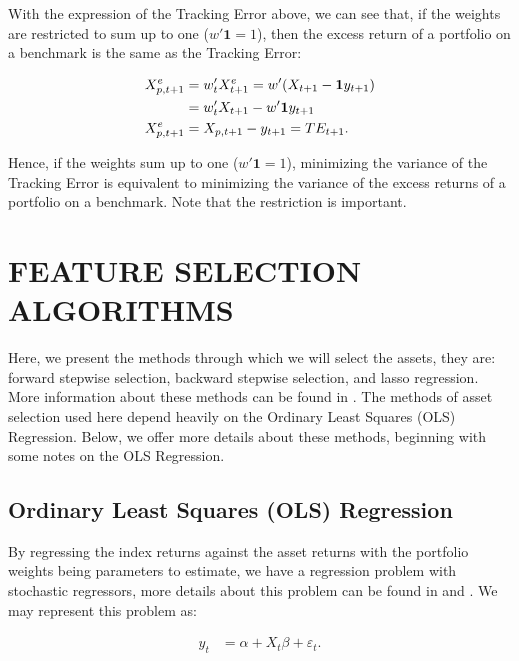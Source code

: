 \documentclass[12pt,oneside,a4paper]{memoir}
\begin{document}
With the expression of the Tracking Error above, we can see that, if the weights are restricted to sum up to one ($w'\mathbf{1}=1$), then the excess return of a portfolio on a benchmark is the same as the Tracking Error:

\vspace{-18 pt}
\begin{align}
	\notag
	X^{e}_{p,t+1} & = w_{t}'X^{e}_{t+1} = w'(X_{t+1} - \mathbf{1} y_{t+1})
	\\
	\notag
	& = w_{t}'X_{t+1} - w'\mathbf{1} y_{t+1}
	\\
	\label{eq:TER}
	X^{e}_{p,t+1} & = X_{p,t+1} - y_{t+1} = TE_{t+1}.
\end{align}

\noindent
Hence, if the weights sum up to one ($w'\mathbf{1}=1$), minimizing the variance of the Tracking Error is equivalent to minimizing the variance of the excess returns of a portfolio on a benchmark.
Note that the restriction is important.

\section{FEATURE SELECTION ALGORITHMS} \label{sec:selection}

Here, we present the methods through which we will select the assets, they are:
forward stepwise selection, backward stepwise selection, and lasso regression.
More information about these methods can be found in .
The methods of asset selection used here depend heavily on the Ordinary Least Squares (OLS) Regression.
Below, we offer more details about these methods, beginning with some notes on the OLS Regression.

\subsection{Ordinary Least Squares (OLS) Regression}

By regressing the index returns against the asset returns with the portfolio weights being parameters to estimate, we have a regression problem with stochastic regressors, more details about this problem can be found in  and .
We may represent this problem as:

\vspace{-18 pt}
\begin{align*} 
	y_{t} &= \alpha + X_{t}\beta + \varepsilon_{t}.
\end{align*}
\end{document}
